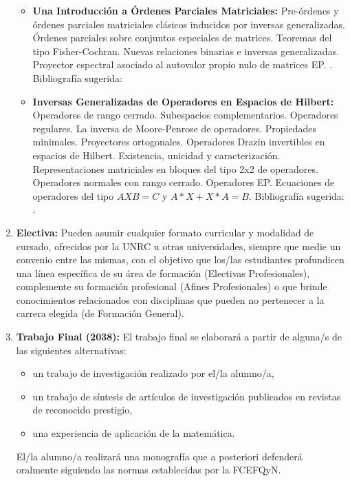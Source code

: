 \documentclass[a4paper, 12pt]{article}
\begin{document}
\begin{enumerate}
\begin{itemize}
\item\textbf{Una Introducción a Órdenes Parciales Matriciales:} Pre-órdenes y órdenes parciales matriciales clásicos inducidos por inversas generalizadas. Órdenes parciales sobre conjuntos especiales de matrices. Teoremas del tipo Fisher-Cochran. Nuevas relaciones binarias e inversas generalizadas. Proyector espectral asociado al autovalor propio nulo de matrices EP.
. Bibliografía sugerida: \cite{BaTr1, BaBaLi, BaHa, BaHaLiLi, FeMa1, FeMa2, FeLaLeTh, HaSt, HaSp, Ku, Ma, MiBhMa}

\item\textbf{ Inversas Generalizadas de Operadores en Espacios de Hilbert: }Operadores de rango cerrado. Subespacios complementarios. Operadores regulares. La inversa de Moore-Penrose de operadores. Propiedades minimales. Proyectores ortogonales.  Operadores Drazin invertibles en espacios de Hilbert. Existencia, unicidad y caracterización. Representaciones matriciales en bloques del tipo 2x2 de operadores. Operadores normales con rango cerrado. Operadores EP. Ecuaciones de operadores del tipo $AXB=C$ y $A* X + X* A=B$. Bibliografía sugerida: \cite{BeGr, CvWe, DjRa,Ka,WaWeQi,FeLaLeTh}.

\end{itemize}









\item\textbf{Electiva:}
Pueden asumir cualquier formato curricular y modalidad de cursado, ofrecidos por la UNRC u otras universidades, siempre que medie un convenio entre las mismas, con el objetivo que los/las estudiantes profundicen una línea específica de su área de formación (Electivas Profesionales), complemente su formación profesional (Afines Profesionales) o que brinde conocimientos relacionados con disciplinas que pueden no pertenecer a la carrera elegida (de Formación General).


\item\textbf{Trabajo Final (2038):} El trabajo
final se elaborará a partir de alguna/s de las siguientes
alternativas:
\begin{itemize}
\item un trabajo de investigación realizado por el/la alumno/a,
\item un trabajo de síntesis de artículos de investigación publicados en
revistas de reconocido prestigio,
\item una experiencia de aplicación de la matemática.
\end{itemize}

El/la alumno/a realizará una monografía  que a posteriori defenderá
oralmente siguiendo las normas establecidas por la FCEFQyN.

\end{enumerate}
\end{document}
